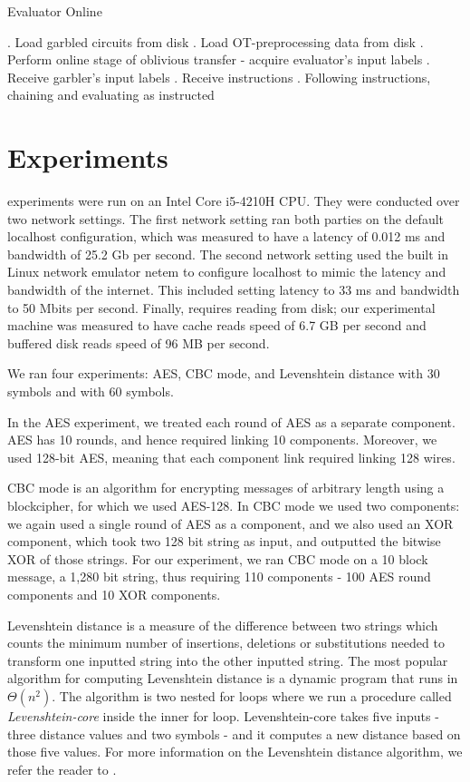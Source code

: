 \begin{algorithm}
    \caption{Evaluator Online}
    \label{alg:evaluator-online}
    \begin{algorithmic}
        . Load garbled circuits from disk
        . Load OT-preprocessing data from disk
        . Perform online stage of oblivious transfer - acquire evaluator's input labels
        . Receive garbler's input labels
        . Receive instructions
        . Following instructions, chaining and evaluating as instructed
    \end{algorithmic}
\end{algorithm}

\section{Experiments}
\CompGC experiments were run on an Intel Core i5-4210H CPU. 
They were conducted over two network settings. 
The first network setting ran both parties on the default localhost configuration, which was measured to have a latency of 0.012 ms and bandwidth of 25.2 Gb per second. 
The second network setting used the built in Linux network emulator {\sf netem} to configure localhost to mimic the latency and bandwidth of the internet. 
This included setting latency to 33 ms and bandwidth to 50 Mbits per second. 
Finally, \CompGC requires reading from disk; our experimental machine was measured to have cache reads speed of 6.7 GB per second and buffered disk reads speed of 96 MB per second.

We ran four experiments: AES, CBC mode, and Levenshtein distance with 30 symbols and with 60 symbols. 

In the AES experiment, we treated each round of AES as a separate component. AES has 10 rounds, and hence required linking 10 components. Moreover, we used 128-bit AES, meaning that each component link required linking 128 wires. 

CBC mode is an algorithm for encrypting messages of arbitrary length using a blockcipher, for which we used AES-128. 
In CBC mode we used two components: we again used a single round of AES as a component, and we also used an XOR component, which took two 128 bit string as input, and outputted the bitwise XOR of those strings.
For our experiment, we ran CBC mode on a 10 block message, a 1,280 bit string, thus requiring 110 components - 100 AES round components and 10 XOR components. 

Levenshtein distance is a measure of the difference between two strings which counts the minimum number of insertions, deletions or substitutions needed to transform one inputted string into the other inputted string. 
The most popular algorithm for computing Levenshtein distance is a dynamic program that runs in $\Theta(n^2)$. 
The algorithm is  two nested for loops where we run a procedure called \textit{Levenshtein-core} inside the inner for loop. 
Levenshtein-core takes five inputs - three distance values and two symbols - and it computes a new distance based on those five values.
For more information on the Levenshtein distance algorithm, we refer the reader to \cite{wiki-leven}. 

